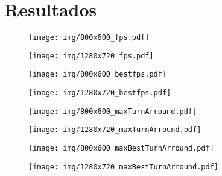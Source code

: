 \section{Resultados}

\begin{figure}[h]

	\texttt{[image: img/800x600\_fps.pdf]}
	\caption{}

\end{figure}

\begin{figure}[h]

	\texttt{[image: img/1280x720\_fps.pdf]}
	\caption{}

\end{figure}

\begin{figure}[h]

	\texttt{[image: img/800x600\_bestfps.pdf]}
	\caption{}

\end{figure}

\begin{figure}[h]

	\texttt{[image: img/1280x720\_bestfps.pdf]}
	\caption{}

\end{figure}

\begin{figure}[h]

	\texttt{[image: img/800x600\_maxTurnArround.pdf]}
	\caption{}

\end{figure}

\begin{figure}[h]

	\texttt{[image: img/1280x720\_maxTurnArround.pdf]}
	\caption{}

\end{figure}

\begin{figure}[h]

	\texttt{[image: img/800x600\_maxBestTurnArround.pdf]}
	\caption{}

\end{figure}

\begin{figure}[h]

	\texttt{[image: img/1280x720\_maxBestTurnArround.pdf]}
	\caption{}

\end{figure}

